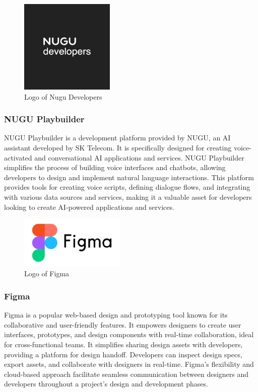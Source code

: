 \documentclass[conference]{IEEEtran}
\begin{document}
        \begin{figure}[htbp]
        \centerline{\includegraphics[width=4.5cm]{Images/logo/nugu.png}}
        \label{fig}
        \caption{Logo of Nugu Developers}
        \end{figure}
        \subsubsection{NUGU Playbuilder}
        NUGU Playbuilder is a development platform provided by NUGU, an AI assistant developed by SK Telecom. It is specifically designed for creating voice-activated and conversational AI applications and services. NUGU Playbuilder simplifies the process of building voice interfaces and chatbots, allowing developers to design and implement natural language interactions. This platform provides tools for creating voice scripts, defining dialogue flows, and integrating with various data sources and services, making it a valuable asset for developers looking to create AI-powered applications and services.\\

        \begin{figure}[htbp]
        \centerline{\includegraphics[width=5cm]{Images/logo/figma.png}}
        \label{fig}
        \caption{Logo of Figma}
        \end{figure}
        \subsubsection{Figma}
        Figma is a popular web-based design and prototyping tool known for its collaborative and user-friendly features. It empowers designers to create user interfaces, prototypes, and design components with real-time collaboration, ideal for cross-functional teams. It simplifies sharing design assets with developers, providing a platform for design handoff. Developers can inspect design specs, export assets, and collaborate with designers in real-time. Figma's flexibility and cloud-based approach facilitate seamless communication between designers and developers throughout a project's design and development phases.\\
\end{document}
